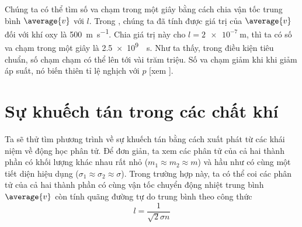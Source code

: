 Chúng ta có thể tìm số va chạm trong một giây bằng cách chia vận tốc trung bình $\average{v}$ với $l$. Trong , chúng ta đã tính được giá trị của $\average{v}$ đối với khí oxy là \SI{500}{\metre\per\second}. Chia giá trị này cho $l=\SI{2e-7}{\metre}$, thì ta có số va chạm trong một giây là \SI{2.5e9}{\per\second}. Như ta thấy, trong điều kiện tiêu chuẩn, số chạm chạm có thể lên tới vài trăm triệu. Số va chạm giảm khi khi giảm áp suất, nó biến thiên tỉ lệ nghịch với $p$ [xem ].

\section{Sự khuếch tán trong các chất khí}\label{sec:16_3}

Ta sẽ thử tìm phương trình về sự khuếch tán bằng cách xuất phát từ các khái niệm về động học phân tử. Để đơn giản, ta xem các phân tử của cả hai thành phần có khối lượng khác nhau rất nhỏ ($m_1\approx m_2\approx m$) và hầu như có cùng một tiết diện hiệu dụng ($\sigma_1\approx\sigma_2\approx\sigma$). Trong trường hợp này, ta có thể coi các phân tử của cả hai thành phần có cùng vận tốc chuyển động nhiệt trung bình $\average{v}$ còn tính quãng đường tự do trung bình theo công thức
\begin{equation*}
    l = \frac{1}{\sqrt{2}\sigma n}
\end{equation*}

